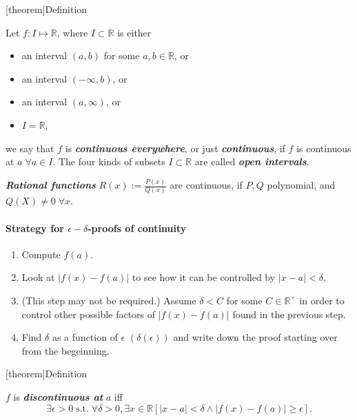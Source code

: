 \documentclass[12pt]{report}
\theoremstyle{definition}
\begin{document}
[theorem]{Definition}
\begin{continuous function}
    Let $f:I\mapsto\mathbb{R}$, where $I\subset\mathbb{R}$ is either
    \begin{itemize}
        \item an interval $(a,b)$ for some $a,b\in\mathbb{R}$, or
        \item an interval $(-\infty, b)$, or
        \item an interval $(a, \infty)$, or
        \item $I = \mathbb{R}$,
    \end{itemize}
    we say that $f$ is \textbf{\emph{continuous everywhere}}, or just \textbf{\emph{continuous}},
    if $f$ is continuous at $a \;\forall a\in I$.
    The four kinds of subsets $I\subset\mathbb{R}$ are called \textbf{\emph{open intervals}}.
\end{continuous function}

\begin{ex}
    \textbf{\emph{Rational functions}} $R(x):=\frac{P(x)}{Q(x)}$ are continuous,
    if $P, Q$ polynomial, and $Q(X) \neq 0 \;\forall x$.
\end{ex}


\paragraph{Strategy for $\epsilon-\delta$-proofs of continuity}
\begin{enumerate}
    \item Compute $f(a)$.
    \item Look at $|f(x)-f(a)|$ to see how it can be controlled by $|x-a|<\delta$.
    \item (This step may not be required.) Assume $\delta<C$ for some $C\in\mathbb{R}^{+}$
        in order to control other possible factors of $|f(x) - f(a)|$ found in the previous step.
    \item Find $\delta$ as a function of $\epsilon$ $(\delta(\epsilon))$ and write down
        the proof starting over from the begeinning.
\end{enumerate}

[theorem]{Definition}
\begin{discontinuous at a}
    $f$ is \textbf{\emph{discontinuous at}} $a$ iff\[
        \exists \epsilon>0 \;\text{s.t.}\; \forall\delta>0,
        \exists x\in\mathbb{R} [|x-a|<\delta \wedge|f(x)-f(a)|\ge\epsilon].
    \]
\end{discontinuous at a}
\end{document}
